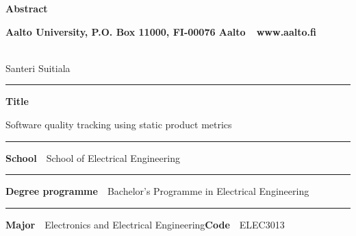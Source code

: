 
\newpage
{}
{}


\begin{spacing}{.88}

{\parindent0pt %

{\fontsize{13.9pt}{13.9pt}\selectfont
\vspace{-8.9mm}\hfill{\bfseries\sffamily\lsstyle Abstract}}

{\fontsize{9.48pt}{9.48pt}\selectfont
\vspace{.9mm}\hfill{\bfseries\sffamily\lsstyle Aalto University, P.O. Box 11000, FI-00076 Aalto~~\textcolor{aaltoGray}{www.aalto.fi}}}

\\
{\small Santeri Suitiala}

\vspace{-2.4mm}\rule{\textwidth}{.75pt}

{\fontsize{10.5pt}{10.5pt}\bfseries\sffamily\lsstyle Title}\\
\parbox[t]{\textwidth}{\raggedright\small Software quality tracking using static product metrics}

\vspace{.5mm}\rule{\textwidth}{.75pt}

{\fontsize{10.5pt}{10.5pt}\bfseries\sffamily\lsstyle School}~~{\small School of Electrical Engineering}

\vspace{-2.4mm}\rule{\textwidth}{.75pt}

{\fontsize{10.5pt}{10.5pt}\bfseries\sffamily\lsstyle Degree programme}~~{\small Bachelor’s Programme in Electrical Engineering}

\vspace{-2.4mm}\rule{\textwidth}{.75pt}

{\fontsize{10.5pt}{10.5pt}\bfseries\sffamily\lsstyle Major}~~{\small Electronics and Electrical Engineering}\hfill{\fontsize{10.5pt}{10.5pt}\bfseries\sffamily\lsstyle Code}~~{\small ELEC3013}

}
\end{spacing}
